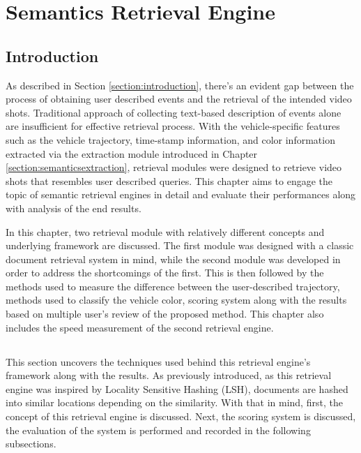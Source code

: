 
\chapter{Semantics Retrieval Engine}

\label{section:retrievalengine}
\section{Introduction}

As described in Section \ref{section:introduction}, there's an evident gap between the process of obtaining user described events and the retrieval of the intended video shots. Traditional approach of collecting text-based description of events alone are insufficient for effective retrieval process.  With the vehicle-specific features such as the vehicle trajectory, time-stamp information, and color information extracted via the extraction module introduced in Chapter \ref{section:semanticsextraction}, retrieval modules were designed to retrieve video shots that resembles user described queries. This chapter aims to engage the topic of semantic retrieval engines in detail and evaluate their performances along with analysis of the end results.


In this chapter, two retrieval module with relatively different concepts and underlying framework are discussed. The first module was designed with a classic document retrieval system in mind, while the second module was developed in order to address the shortcomings of the first. This is then followed by the methods used to measure the difference between the user-described trajectory, methods used to classify the vehicle color, scoring system along with the results based on multiple user's review of the proposed method. This chapter also includes the speed measurement of the second retrieval engine.






\section{\versionOne}
This section uncovers the techniques used behind this retrieval engine's framework along with the results. As previously introduced, as this retrieval engine was inspired by Locality Sensitive Hashing (LSH), documents are hashed into similar locations depending on the similarity. With that in mind, first, the concept of this retrieval engine is discussed. Next, the scoring system is discussed, the evaluation of the system is performed and recorded in the following subsections.




